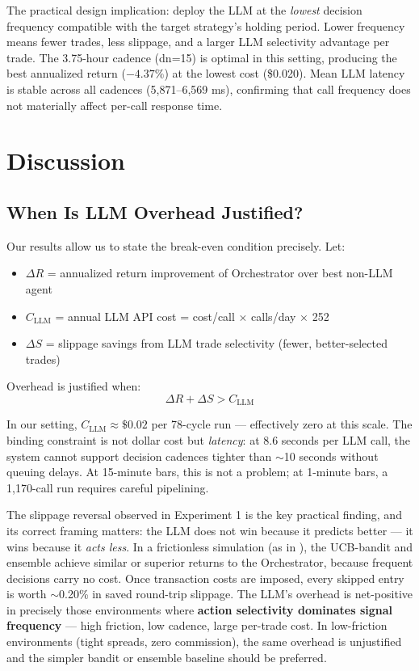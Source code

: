 \documentclass[10pt,conference]{IEEEtran}
\begin{document}
The practical design implication: deploy the LLM at the \textit{lowest} decision frequency compatible with the target strategy's holding period. Lower frequency means fewer trades, less slippage, and a larger LLM selectivity advantage per trade. The 3.75-hour cadence (dn=15) is optimal in this setting, producing the best annualized return ($-4.37\%$) at the lowest cost (\$0.020). Mean LLM latency is stable across all cadences (5,871--6,569 ms), confirming that call frequency does not materially affect per-call response time.


\section{Discussion}

\subsection{When Is LLM Overhead Justified?}

Our results allow us to state the break-even condition precisely. Let:
\begin{itemize}
    \item $\Delta R$ = annualized return improvement of Orchestrator over best non-LLM agent
    \item $C_{\text{LLM}}$ = annual LLM API cost = cost/call $\times$ calls/day $\times$ 252
    \item $\Delta S$ = slippage savings from LLM trade selectivity (fewer, better-selected trades)
\end{itemize}

Overhead is justified when:
\begin{equation}
    \Delta R + \Delta S > C_{\text{LLM}}
    \label{eq:breakeven}
\end{equation}

In our setting, $C_{\text{LLM}} \approx \$0.02$ per 78-cycle run --- effectively zero at this scale. The binding constraint is not dollar cost but \textit{latency}: at 8.6 seconds per LLM call, the system cannot support decision cadences tighter than $\sim$10 seconds without queuing delays. At 15-minute bars, this is not a problem; at 1-minute bars, a 1,170-call run requires careful pipelining.

The slippage reversal observed in Experiment 1 is the key practical finding, and its correct framing matters: the LLM does not win because it predicts better --- it wins because it \textit{acts less}. In a frictionless simulation (as in \cite{companion}), the UCB-bandit and ensemble achieve similar or superior returns to the Orchestrator, because frequent decisions carry no cost. Once transaction costs are imposed, every skipped entry is worth $\sim$0.20\% in saved round-trip slippage. The LLM's overhead is net-positive in precisely those environments where \textbf{action selectivity dominates signal frequency} --- high friction, low cadence, large per-trade cost. In low-friction environments (tight spreads, zero commission), the same overhead is unjustified and the simpler bandit or ensemble baseline should be preferred.
\end{document}
